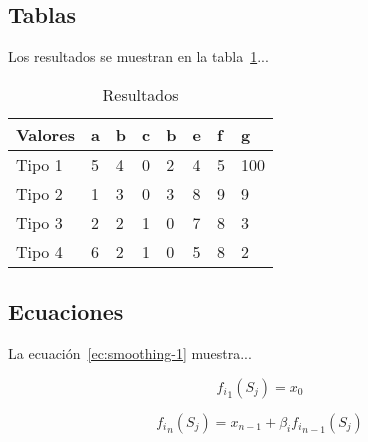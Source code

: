 

\subsection{Tablas}

Los resultados se muestran en la tabla~\ref{table:resultados}...

\begin{table}[htbp!]
\begin{center}
\begin{tabular}{|l|l|l|l|l|l|l|l|}
\hline
Valores    & a & b & c & b & e  & f & g \\
\hline
Tipo 1     & 5 & 4 & 0 & 2 &  4 & 5 &  100  \\
Tipo 2     & 1 & 3 & 0 & 3 &  8 & 9 &  9  \\
Tipo 3     & 2 & 2 & 1 & 0 &  7 & 8 &  3  \\
Tipo 4     & 6 & 2 & 1 & 0 &  5 & 8 &  2  \\
\hline
\end{tabular}
\end{center}
\caption{Resultados\label{table:resultados}}
\end{table}

\subsection{Ecuaciones}

La ecuación~\ref{ec:smoothing-1} muestra...

\begin{equation} \label{ec:smoothing-1}
 {f_i}_1 (S_j) = x_{0}
\end{equation} 


\begin{equation} \label{ec:smoothing-2}
 {f_i}_n (S_j) =  x_{n-1} + \beta_i {f_i}_{n-1} (S_j)
\end{equation} 